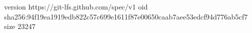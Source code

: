 version https://git-lfs.github.com/spec/v1
oid sha256:94f19ea1919edb822c57c699e1611f87e00650caab7aee53edcf94d776ab5cf7
size 23247
